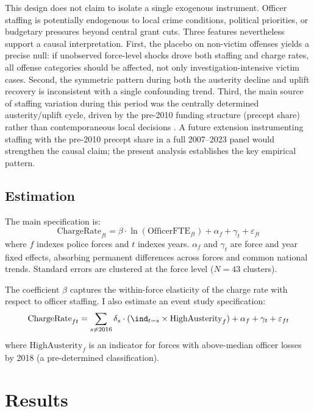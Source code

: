 \documentclass[12pt]{article}
\begin{document}
This design does not claim to isolate a single exogenous instrument. Officer staffing is potentially endogenous to local crime conditions, political priorities, or budgetary pressures beyond central grant cuts. Three features nevertheless support a causal interpretation. First, the placebo on non-victim offenses yields a precise null: if unobserved force-level shocks drove both staffing and charge rates, all offense categories should be affected, not only investigation-intensive victim cases. Second, the symmetric pattern during both the austerity decline and uplift recovery is inconsistent with a single confounding trend. Third, the main source of staffing variation during this period was the centrally determined austerity/uplift cycle, driven by the pre-2010 funding structure (precept share) rather than contemporaneous local decisions \citep{nao2015}. A future extension instrumenting staffing with the pre-2010 precept share in a full 2007--2023 panel would strengthen the causal claim; the present analysis establishes the key empirical pattern.

\subsection{Estimation}

The main specification is:
\begin{equation}
  \text{ChargeRate}_{ft} = \beta \cdot \ln(\text{OfficerFTE}_{ft}) + \alpha_f + \gamma_t + \varepsilon_{ft}
\label{eq:main}
\end{equation}
where $f$ indexes police forces and $t$ indexes years. $\alpha_f$ and $\gamma_t$ are force and year fixed effects, absorbing permanent differences across forces and common national trends. Standard errors are clustered at the force level ($N = 43$ clusters).

The coefficient $\beta$ captures the within-force elasticity of the charge rate with respect to officer staffing. I also estimate an event study specification:
\begin{equation}
  \text{ChargeRate}_{ft} = \sum_{s \neq 2016} \delta_s \cdot (\ind_{t=s} \times \text{HighAusterity}_f) + \alpha_f + \gamma_t + \varepsilon_{ft}
\label{eq:eventstudy}
\end{equation}
where $\text{HighAusterity}_f$ is an indicator for forces with above-median officer losses by 2018 (a pre-determined classification).

\section{Results}
\end{document}
